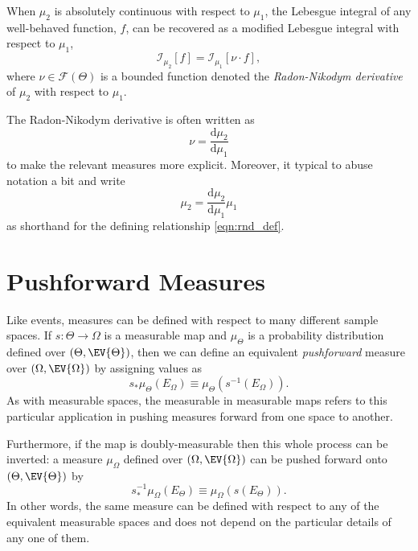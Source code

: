 When $\mu_{2}$ is absolutely continuous with respect to
$\mu_{1}$, the Lebesgue integral of any well-behaved
function, $f$, can be recovered as a modified Lebesgue 
integral with respect to $\mu_{1}$,
%
\begin{equation} \label{eqn:rnd_def}
\mathcal{I}_{\mu_{2}} \! \left[ f \right]
=
\mathcal{I}_{\mu_{1}} \! \left[ \nu \cdot f \right],
\end{equation}
%
where $\nu \in \mathcal{F} \! \left( \Theta \right)$ is a bounded 
function denoted the \emph{Radon-Nikodym derivative} of 
$\mu_{2}$ with respect to $\mu_{1}$.  

The Radon-Nikodym derivative is often written as
%
\begin{equation*}
\nu = \frac{ \mathrm{d} \mu_{2} }{ \mathrm{d} \mu_{1} }
\end{equation*}
%
to make the relevant measures more explicit.  Moreover, it typical to
abuse notation a bit and write
%
\begin{equation*}
\mu_{2} = 
\frac{ \mathrm{d} \mu_{2} }{ \mathrm{d} \mu_{1} } 
\mu_{1}
\end{equation*}
%
as shorthand for the defining relationship \eqref{eqn:rnd_def}.

\section{Pushforward Measures}

Like events, measures can be defined with respect to many 
different sample spaces.  If $s : \Theta \rightarrow \Omega$ 
is a measurable map and $\mu_{\Theta}$ is a probability 
distribution defined over $\left( \Theta, \EV{\Theta} \right)$, 
then we can define an equivalent \emph{pushforward} measure 
over $\left( \Omega, \EV{\Omega} \right)$ by assigning values as
%
\begin{equation*}
s_{*} \mu_{\Theta} \! \left( E_{\Omega} \right)
\equiv
\mu_{\Theta} \! \left( s^{-1} \! \left( E_{\Omega} \right) \right).
\end{equation*}
%
As with measurable spaces, the measurable in measurable 
maps refers to this particular application in pushing measures 
forward from one space to another.

Furthermore, if the map is doubly-measurable then this whole 
process can be inverted: a measure $\mu_{\Omega}$ defined 
over $\left( \Omega, \EV{\Omega} \right)$ can be pushed
forward onto $\left( \Theta, \EV{\Theta} \right)$ by
%
\begin{equation*}
s^{-1}_{*} \mu_{\Omega} \! \left( E_{\Theta} \right)
\equiv
\mu_{\Omega} \! \left( s \! \left( E_{\Theta} \right) \right).
\end{equation*}
%
In other words, the same measure can be defined with respect
to any of the equivalent measurable spaces and does not 
depend on the particular details of any one of them.

